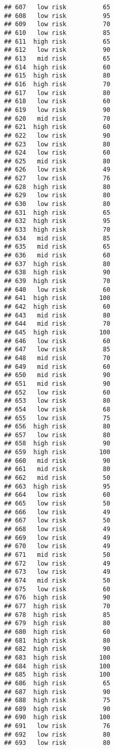 \documentclass[
  ignorenonframetext,
]{beamer}
\begin{document}
\begin{frame}[fragile]
\begin{verbatim}
## 607   low risk          65
## 608   low risk          95
## 609   low risk          70
## 610   low risk          85
## 611  high risk          65
## 612   low risk          90
## 613   mid risk          65
## 614  high risk          60
## 615  high risk          80
## 616  high risk          70
## 617   low risk          80
## 618   low risk          60
## 619   low risk          90
## 620   mid risk          70
## 621  high risk          60
## 622   low risk          90
## 623   low risk          80
## 624   low risk          60
## 625   mid risk          80
## 626   low risk          49
## 627   low risk          76
## 628  high risk          80
## 629   low risk          80
## 630   low risk          80
## 631  high risk          65
## 632  high risk          95
## 633  high risk          70
## 634   mid risk          85
## 635   mid risk          65
## 636   mid risk          60
## 637  high risk          80
## 638  high risk          90
## 639  high risk          70
## 640   low risk          60
## 641  high risk         100
## 642  high risk          60
## 643   mid risk          80
## 644   mid risk          70
## 645  high risk         100
## 646   low risk          60
## 647   low risk          85
## 648   mid risk          70
## 649   mid risk          60
## 650   mid risk          90
## 651   mid risk          90
## 652   low risk          60
## 653   low risk          80
## 654   low risk          68
## 655   low risk          75
## 656  high risk          80
## 657   low risk          80
## 658  high risk          90
## 659  high risk         100
## 660   mid risk          90
## 661   mid risk          80
## 662   mid risk          50
## 663  high risk          95
## 664   low risk          60
## 665   low risk          50
## 666   low risk          49
## 667   low risk          50
## 668   low risk          49
## 669   low risk          49
## 670   low risk          49
## 671   mid risk          50
## 672   low risk          49
## 673   low risk          49
## 674   mid risk          50
## 675   low risk          60
## 676  high risk          90
## 677  high risk          70
## 678  high risk          85
## 679  high risk          80
## 680  high risk          60
## 681  high risk          80
## 682  high risk          90
## 683  high risk         100
## 684  high risk         100
## 685  high risk         100
## 686  high risk          65
## 687  high risk          90
## 688  high risk          75
## 689  high risk          90
## 690  high risk         100
## 691   low risk          76
## 692   low risk          80
## 693   low risk          80

\end{verbatim}
\end{frame}
\end{document}
